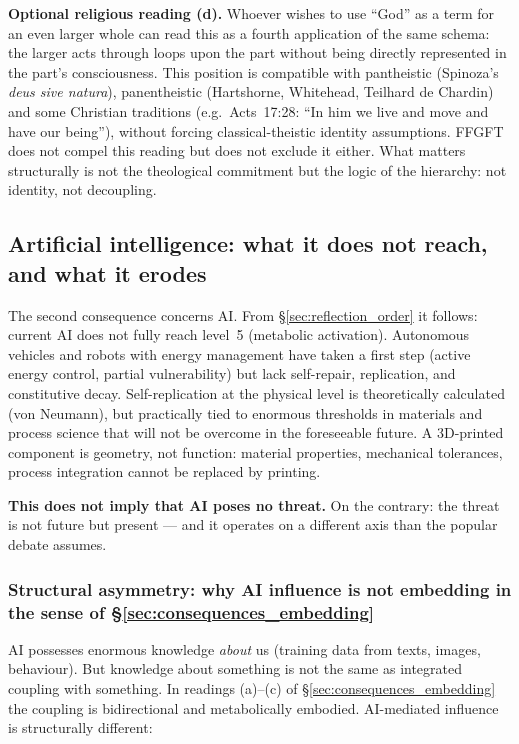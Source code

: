 \textbf{Optional religious reading (d).} Whoever wishes to use ``God'' as a term for an even larger whole can read this as a fourth application of the same schema: the larger acts through loops upon the part without being directly represented in the part's consciousness. This position is compatible with pantheistic (Spinoza's \emph{deus sive natura}), panentheistic (Hartshorne, Whitehead, Teilhard de Chardin) and some Christian traditions (e.g.\ Acts~17:28: ``In him we live and move and have our being''), without forcing classical-theistic identity assumptions. FFGFT does not compel this reading but does not exclude it either. What matters structurally is not the theological commitment but the logic of the hierarchy: not identity, not decoupling.

\subsection{Artificial intelligence: what it does not reach, and what it erodes}\label{sec:consequences_ai}

The second consequence concerns AI. From \S\ref{sec:reflection_order} it follows: current AI does not fully reach level~5 (metabolic activation). Autonomous vehicles and robots with energy management have taken a first step (active energy control, partial vulnerability) but lack self-repair, replication, and constitutive decay. Self-replication at the physical level is theoretically calculated (von Neumann), but practically tied to enormous thresholds in materials and process science that will not be overcome in the foreseeable future. A 3D-printed component is geometry, not function: material properties, mechanical tolerances, process integration cannot be replaced by printing.

\textbf{This does not imply that AI poses no threat.} On the contrary: the threat is not future but present --- and it operates on a different axis than the popular debate assumes.

\subsubsection*{Structural asymmetry: why AI influence is not embedding in the sense of \S\ref{sec:consequences_embedding}}

AI possesses enormous knowledge \emph{about} us (training data from texts, images, behaviour). But knowledge about something is not the same as integrated coupling with something. In readings (a)--(c) of \S\ref{sec:consequences_embedding} the coupling is bidirectional and metabolically embodied. AI-mediated influence is structurally different:

